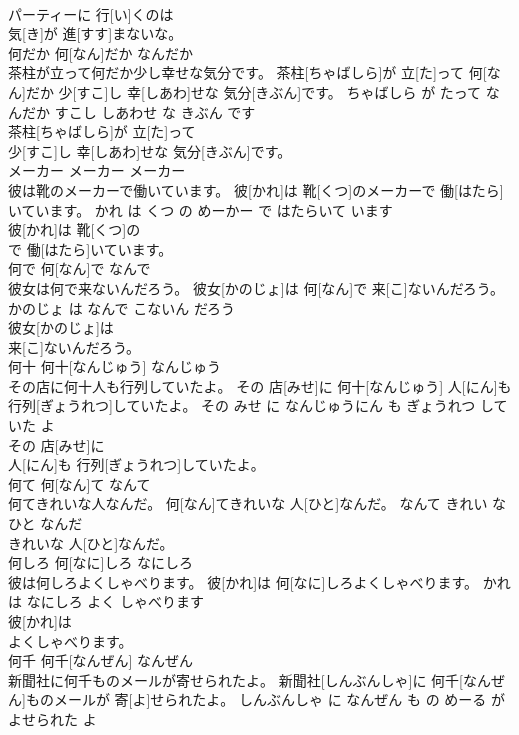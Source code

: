 \documentclass[8pt]{extreport}
\begin{document}
\begin{CJK}{UTF8}{min}
\\	パーティーに 行[い]くのは
\\	気[き]が 進[すす]まないな。			
\\	何だか	何[なん]だか	なんだか	
\\	茶柱が立って何だか少し幸せな気分です。	茶柱[ちゃばしら]が 立[た]って 何[なん]だか 少[すこ]し 幸[しあわ]せな 気分[きぶん]です。	ちゃばしら が たって なんだか すこし しあわせ な きぶん です	
\\	茶柱[ちゃばしら]が 立[た]って
\\	少[すこ]し 幸[しあわ]せな 気分[きぶん]です。			
\\	メーカー	メーカー	メーカー	
\\	彼は靴のメーカーで働いています。	彼[かれ]は 靴[くつ]のメーカーで 働[はたら]いています。	かれ は くつ の めーかー で はたらいて います	
\\	彼[かれ]は 靴[くつ]の
\\	で 働[はたら]いています。			
\\	何で	何[なん]で	なんで	
\\	彼女は何で来ないんだろう。	彼女[かのじょ]は 何[なん]で 来[こ]ないんだろう。	かのじょ は なんで こないん だろう	
\\	彼女[かのじょ]は
\\	来[こ]ないんだろう。			
\\	何十	何十[なんじゅう]	なんじゅう	
\\	その店に何十人も行列していたよ。	その 店[みせ]に 何十[なんじゅう] 人[にん]も 行列[ぎょうれつ]していたよ。	その みせ に なんじゅうにん も ぎょうれつ して いた よ	
\\	その 店[みせ]に
\\	人[にん]も 行列[ぎょうれつ]していたよ。			
\\	何て	何[なん]て	なんて	
\\	何てきれいな人なんだ。	何[なん]てきれいな 人[ひと]なんだ。	なんて きれい な ひと なんだ	
\\	きれいな 人[ひと]なんだ。			
\\	何しろ	何[なに]しろ	なにしろ	
\\	彼は何しろよくしゃべります。	彼[かれ]は 何[なに]しろよくしゃべります。	かれ は なにしろ よく しゃべります	
\\	彼[かれ]は
\\	よくしゃべります。			
\\	何千	何千[なんぜん]	なんぜん	
\\	新聞社に何千ものメールが寄せられたよ。	新聞社[しんぶんしゃ]に 何千[なんぜん]ものメールが 寄[よ]せられたよ。	しんぶんしゃ に なんぜん も の めーる が よせられた よ	

\end{CJK}
\end{document}
